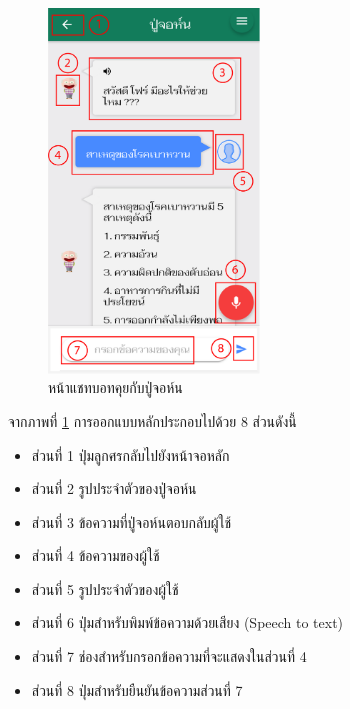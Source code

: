 		\begin{figure}[H]
			\centering
			\includegraphics[width=0.5\textwidth]{Figures/3/UI/chatbot}
			\caption{หน้าแชทบอทคุยกับปู่จอห์น}
			\label{Fig:แชทบอท}
		\end{figure}
		จากภาพที่ \ref{Fig:แชทบอท} การออกแบบหลักประกอบไปด้วย 8 ส่วนดังนี้
		\begin{itemize}
			\item ส่วนที่ 1 ปุ่มลูกศรกลับไปยังหน้าจอหลัก
			\item ส่วนที่ 2 รูปประจำตัวของปู่จอห์น
			\item ส่วนที่ 3 ข้อความที่ปู่จอห์นตอบกลับผู้ใช้
			\item ส่วนที่ 4 ข้อความของผู้ใช้
			\item ส่วนที่ 5 รูปประจำตัวของผู้ใช้
			\item ส่วนที่ 6 ปุ่มสำหรับพิมพ์ข้อความด้วยเสียง (Speech to text)
			\item ส่วนที่ 7 ช่องสำหรับกรอกข้อความที่จะแสดงในส่วนที่ 4
			\item ส่วนที่ 8 ปุ่มสำหรับยืนยันข้อความส่วนที่ 7
		\end{itemize}

